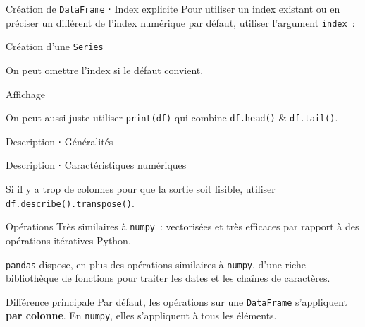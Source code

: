 \begin{frame}{Création de \texttt{DataFrame} ⋅ Index explicite}
  Pour utiliser un index existant ou en préciser un différent de l'index numérique par défaut, utiliser l'argument \texttt{index}~:

\end{frame}

\begin{frame}{Création d'une \texttt{Series}}

  On peut omettre l'index si le défaut convient.
\end{frame}

\begin{frame}{Affichage}

  On peut aussi juste utiliser \texttt{print(df)} qui combine \texttt{df.head()} \& \texttt{df.tail()}.
\end{frame}

\begin{frame}{Description ⋅ Généralités}
\end{frame}

\begin{frame}{Description ⋅ Caractéristiques numériques}

  Si il y a trop de colonnes pour que la sortie soit lisible, utiliser \texttt{df.describe().transpose()}.
\end{frame}

\begin{frame}{Opérations}
  Très similaires à \texttt{numpy}~: vectorisées et très efficaces par rapport à des opérations itératives Python.

  \texttt{pandas} dispose, en plus des opérations similaires à \texttt{numpy}, d'une riche bibliothèque de fonctions pour traiter les dates et les chaînes de caractères.

  \begin{alertblock}{Différence principale}
    Par défaut, les opérations sur une \texttt{DataFrame} s'appliquent \textbf{par colonne}. En \texttt{numpy}, elles s'appliquent à tous les éléments.
  \end{alertblock}
\end{frame}

